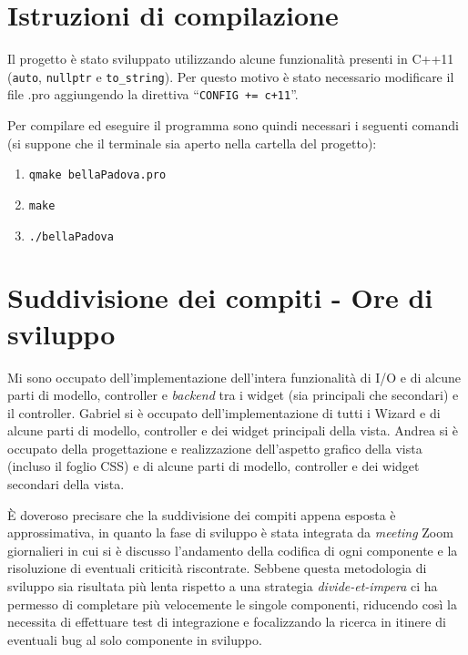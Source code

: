\documentclass[
]{article}
\providecommand{\tightlist}{%
  \setlength{\itemsep}{0pt}\setlength{\parskip}{0pt}}
\begin{document}
\hypertarget{istruzioni-di-compilazione}{%
\section{Istruzioni di compilazione}\label{istruzioni-di-compilazione}}

Il progetto è stato sviluppato utilizzando alcune funzionalità presenti
in C++11 (\texttt{auto}, \texttt{nullptr} e \texttt{to\_string}). Per
questo motivo è stato necessario modificare il file .pro aggiungendo la
direttiva ``\texttt{CONFIG\ +=\ c+11}''.

Per compilare ed eseguire il programma sono quindi necessari i seguenti
comandi (si suppone che il terminale sia aperto nella cartella del
progetto):

\begin{enumerate}
\def\labelenumi{\arabic{enumi}.}
\tightlist
\item
  \texttt{qmake\ bellaPadova.pro}
\item
  \texttt{make}
\item
  \texttt{./bellaPadova}
\end{enumerate}

\hypertarget{suddivisione-dei-compiti---ore-di-sviluppo}{%
\section{Suddivisione dei compiti - Ore di
sviluppo}\label{suddivisione-dei-compiti---ore-di-sviluppo}}

Mi sono occupato dell'implementazione dell'intera funzionalità di I/O e
di alcune parti di modello, controller e \emph{backend} tra i widget
(sia principali che secondari) e il controller. Gabriel si è occupato
dell'implementazione di tutti i Wizard e di alcune parti di modello,
controller e dei widget principali della vista. Andrea si è occupato
della progettazione e realizzazione dell'aspetto grafico della vista
(incluso il foglio CSS) e di alcune parti di modello, controller e dei
widget secondari della vista.

È doveroso precisare che la suddivisione dei compiti appena esposta è
approssimativa, in quanto la fase di sviluppo è stata integrata da
\emph{meeting} Zoom giornalieri in cui si è discusso l'andamento della
codifica di ogni componente e la risoluzione di eventuali criticità
riscontrate. Sebbene questa metodologia di sviluppo sia risultata più
lenta rispetto a una strategia \emph{divide-et-impera} ci ha permesso di
completare più velocemente le singole componenti, riducendo così la
necessita di effettuare test di integrazione e focalizzando la ricerca
in itinere di eventuali bug al solo componente in sviluppo.
\end{document}
